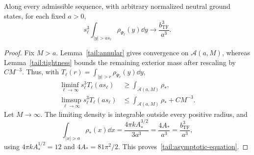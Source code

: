 \begin{theorem}\label{tail:asymptotic}
Along every admissible sequence, with arbitrary normalized neutral
ground states, for each fixed $a>0$,
\begin{equation}\label{tail:asymptotic-equation}
 s_\ell^3\int_{|y|>as_\ell}\rho_{\Psi_\ell}(y)\dd y
       \longrightarrow \frac{b_{\mathrm{TF}}^3}{a^3}.
\end{equation}
\end{theorem}

\begin{proof}
Fix $M>a$. Lemma~\ref{tail:annular} gives convergence on
$\mathcal A(a,M)$, whereas Lemma~\ref{tail:tightness} bounds the
remaining exterior mass after rescaling by $CM^{-3}$. Thus, with
$T_\ell(r)=\int_{|y|>r}\rho_{\Psi_\ell}(y)\dd y$,
\begin{align*}
 \liminf_{\ell\to\infty}s_\ell^3T_\ell(as_\ell)
   &\ge \int_{\mathcal A(a,M)}\rho_*,\\
 \limsup_{\ell\to\infty}s_\ell^3T_\ell(as_\ell)
   &\le \int_{\mathcal A(a,M)}\rho_*+CM^{-3}.
\end{align*}
Let $M\to\infty$. The limiting density is integrable outside every
positive radius, and
\[
 \int_{|x|>a}\rho_*(x)\dd x
 =\frac{4\pi kA_*^{3/2}}{3a^3}
 =\frac{4A_*}{a^3}
 =\frac{b_{\mathrm{TF}}^3}{a^3},
\]
using $4\pi kA_*^{1/2}=12$ and $4A_*=81\pi^2/2$.
This proves~\eqref{tail:asymptotic-equation}.
\end{proof}

